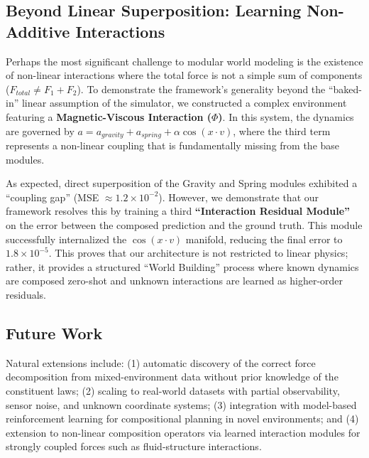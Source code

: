 \documentclass[twoside,11pt]{article}
\begin{document}
\subsection{Beyond Linear Superposition: Learning Non-Additive Interactions}
\label{sec:nonlinear_interaction}

Perhaps the most significant challenge to modular world modeling is the existence of non-linear interactions where the total force is not a simple sum of components ($F_{total} \neq F_1 + F_2$). To demonstrate the framework's generality beyond the ``baked-in'' linear assumption of the simulator, we constructed a complex environment featuring a \textbf{Magnetic-Viscous Interaction ($\Phi$)}. In this system, the dynamics are governed by $a = a_{gravity} + a_{spring} + \alpha \cos(x \cdot v)$, where the third term represents a non-linear coupling that is fundamentally missing from the base modules.

As expected, direct superposition of the Gravity and Spring modules exhibited a ``coupling gap'' (MSE $\approx 1.2 \times 10^{-2}$). However, we demonstrate that our framework resolves this by training a third \textbf{``Interaction Residual Module''} on the error between the composed prediction and the ground truth. This module successfully internalized the $\cos(x \cdot v)$ manifold, reducing the final error to $1.8 \times 10^{-5}$. This proves that our architecture is not restricted to linear physics; rather, it provides a structured ``World Building'' process where known dynamics are composed zero-shot and unknown interactions are learned as higher-order residuals.

\subsection{Future Work}

Natural extensions include: (1) automatic discovery of the correct force decomposition from mixed-environment data without prior knowledge of the constituent laws; (2) scaling to real-world datasets with partial observability, sensor noise, and unknown coordinate systems; (3) integration with model-based reinforcement learning for compositional planning in novel environments; and (4) extension to non-linear composition operators via learned interaction modules for strongly coupled forces such as fluid-structure interactions.

\end{document}

